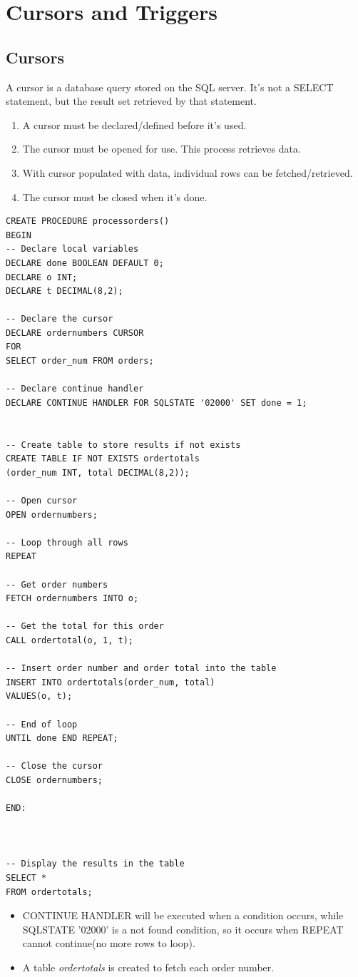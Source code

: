 \documentclass[12pt,oneside,a4paper]{article}
\begin{document}
\section{Cursors and Triggers}
\subsection{Cursors}
A cursor is a database query stored on the SQL server. It's not a SELECT statement, but the result set retrieved by that statement.

\begin{enumerate}
\item A cursor must be declared/defined before it's used.
\item The cursor must be opened for use. This process retrieves data. 
\item With cursor populated with data, individual rows can be fetched/retrieved. 
\item The cursor must be closed when it's done. 
\end{enumerate} 


\begin{lstlisting}
CREATE PROCEDURE processorders()
BEGIN 
-- Declare local variables 
DECLARE done BOOLEAN DEFAULT 0;
DECLARE o INT; 
DECLARE t DECIMAL(8,2);

-- Declare the cursor 
DECLARE ordernumbers CURSOR 
FOR 
SELECT order_num FROM orders;

-- Declare continue handler 
DECLARE CONTINUE HANDLER FOR SQLSTATE '02000' SET done = 1;


-- Create table to store results if not exists 
CREATE TABLE IF NOT EXISTS ordertotals
(order_num INT, total DECIMAL(8,2));

-- Open cursor 
OPEN ordernumbers;

-- Loop through all rows 
REPEAT

-- Get order numbers 
FETCH ordernumbers INTO o;

-- Get the total for this order 
CALL ordertotal(o, 1, t);

-- Insert order number and order total into the table 
INSERT INTO ordertotals(order_num, total) 
VALUES(o, t);

-- End of loop 
UNTIL done END REPEAT;

-- Close the cursor 
CLOSE ordernumbers;

END:



-- Display the results in the table 
SELECT * 
FROM ordertotals;

\end{lstlisting}
\begin{itemize}
\item CONTINUE HANDLER will be executed when a condition occurs, while SQLSTATE '02000' is a not found condition, so it occurs when REPEAT cannot continue(no more rows to loop). 

\item A table \emph{ordertotals} is created to fetch each order number. 
\end{itemize}
\end{document}
